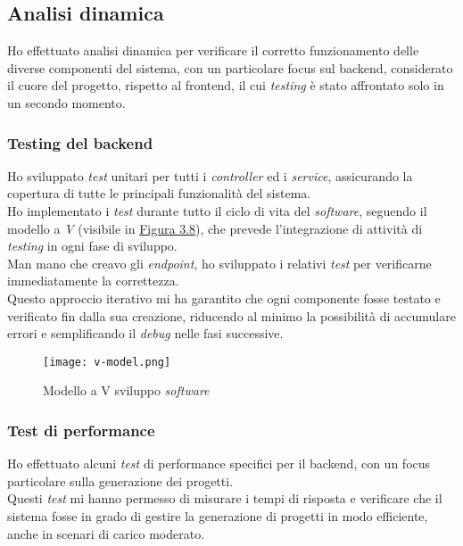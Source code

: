\subsection{Analisi dinamica}
\label{subsec:analisi-dinamica}

Ho effettuato analisi dinamica per verificare il corretto funzionamento delle diverse componenti del sistema, con un particolare focus sul \gls{backend}, considerato il cuore del progetto, rispetto al \gls{frontend}, il cui \textit{testing} è stato affrontato solo in un secondo momento. \\

\pagebreak
\subsubsection{Testing del backend}

Ho sviluppato \textit{test} unitari per tutti i \textit{controller} ed i \textit{service}, assicurando la copertura di tutte le principali funzionalità del sistema.\\

\noindent Ho implementato i \textit{test} durante tutto il ciclo di vita del \textit{software}, seguendo il modello a \textit{V} (visibile in {\hyperref[fig:v-model]{Figura 3.8}}), che prevede l’integrazione di attività di \textit{testing} in ogni fase di sviluppo.\\
    Man mano che creavo gli \textit{endpoint}, ho sviluppato i relativi \textit{test} per verificarne immediatamente la correttezza.\\

\noindent Questo approccio iterativo mi ha garantito che ogni componente fosse testato e verificato fin dalla sua creazione, riducendo al minimo la possibilità di accumulare errori e semplificando il \textit{debug} nelle fasi successive.\\

\begin{figure}[H]
    \centering
    \texttt{[image: v-model.png]}
    \caption{Modello a V sviluppo \textit{software}}
    \label{fig:v-model}  
    \cite{site:v-model}
\end{figure}

\subsubsection{Test di performance}  
Ho effettuato alcuni \textit{test} di performance specifici per il \gls{backend}, con un focus particolare sulla generazione dei progetti.\\
Questi \textit{test} mi hanno permesso di misurare i tempi di risposta e verificare che il sistema fosse in grado di gestire la generazione di progetti in modo efficiente, anche in scenari di carico moderato.\\
